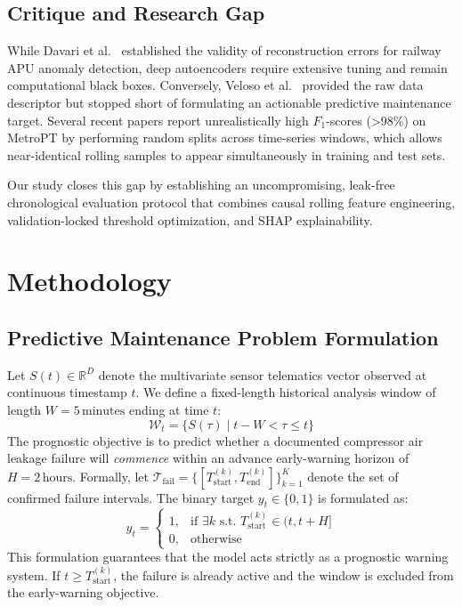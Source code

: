 \documentclass[10pt,twocolumn,a4paper]{article}
\begin{document}
\subsection{Critique and Research Gap}
While Davari et al.~\cite{davari2021predictive} established the validity of reconstruction errors for railway APU anomaly detection, deep autoencoders require extensive tuning and remain computational black boxes. Conversely, Veloso et al.~\cite{veloso2022metropt} provided the raw data descriptor but stopped short of formulating an actionable predictive maintenance target. Several recent papers report unrealistically high $F_1$-scores (>98\%) on MetroPT by performing random splits across time-series windows, which allows near-identical rolling samples to appear simultaneously in training and test sets. 

Our study closes this gap by establishing an uncompromising, leak-free chronological evaluation protocol that combines causal rolling feature engineering, validation-locked threshold optimization, and SHAP explainability.

\section{Methodology}

\subsection{Predictive Maintenance Problem Formulation}
Let $S(t) \in \mathbb{R}^{D}$ denote the multivariate sensor telematics vector observed at continuous timestamp $t$. We define a fixed-length historical analysis window of length $W = 5\,\text{minutes}$ ending at time $t$:
\begin{equation}
\mathcal{W}_t = \{ S(\tau) \mid t - W < \tau \le t \}
\end{equation}
The prognostic objective is to predict whether a documented compressor air leakage failure will \textit{commence} within an advance early-warning horizon of $H = 2\,\text{hours}$. Formally, let $\mathcal{T}_{\text{fail}} = \{ [T_{\text{start}}^{(k)}, T_{\text{end}}^{(k)}] \}_{k=1}^{K}$ denote the set of confirmed failure intervals. The binary target $y_t \in \{0, 1\}$ is formulated as:
\begin{equation}
y_t = \begin{cases} 
1, & \text{if } \exists k \text{ s.t. } T_{\text{start}}^{(k)} \in (t, t + H] \\
0, & \text{otherwise}
\end{cases}
\end{equation}
This formulation guarantees that the model acts strictly as a prognostic warning system. If $t \ge T_{\text{start}}^{(k)}$, the failure is already active and the window is excluded from the early-warning objective.
\end{document}
